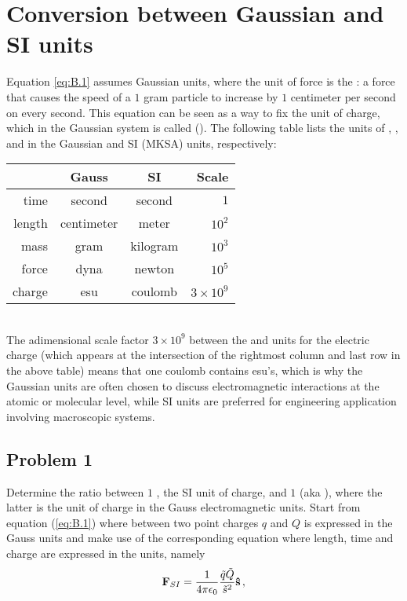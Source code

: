 \section{Conversion between Gaussian and SI units}\label{sec:1.2}
Equation \ref{eq:B.1} assumes Gaussian units, where the unit of force is the : a force that causes the speed of a $1$ gram particle to increase by $1$ centimeter per second on every second. This equation can be seen as a way to fix the unit of charge, which in the Gaussian system is called  (). 
The following table lists the units of , ,  and  in the Gaussian and SI (MKSA) units, respectively:\\ 

\begin{tabular}{r|c|c|r}
         & Gauss      &  SI   & Scale\\ \hline
   time  & second     &  second & $1$\\
  length & centimeter &  meter & $10^2$\\
  mass   & gram       &  kilogram & $10^3$\\
  force  & dyna       &  newton & $10^5$\\
  charge & esu        &  coulomb & $3 \times 10^9$\\
\end{tabular}\\ 

The adimensional scale factor $3 \times 10^9$ between the  and  units for the electric charge (which appears at the intersection of the rightmost column and last row in the above table) means that one coulomb contains  esu's, which is why the Gaussian units are often chosen to discuss electromagnetic interactions at the atomic or molecular level, while SI units are preferred for engineering application involving macroscopic systems.


\subsection*{Problem 1}
Determine the ratio between $1$ , the SI unit of charge, and $1$  (aka ), where the latter is the unit of charge in the Gauss electromagnetic units. 
Start from equation (\ref{eq:B.1}) where  between two point charges $q$ and $Q$ is expressed in the Gauss units and make use of the corresponding equation where length, time and charge are expressed in the  units, namely
\begin{equation}
\vb{F}_{SI}  = \frac{1}{4 \pi \epsilon_{0}} \frac{\tilde{q} \tilde{Q}}{\tilde{s}^2} \vu{s}\,,\label{eq:B.4}
\end{equation}

